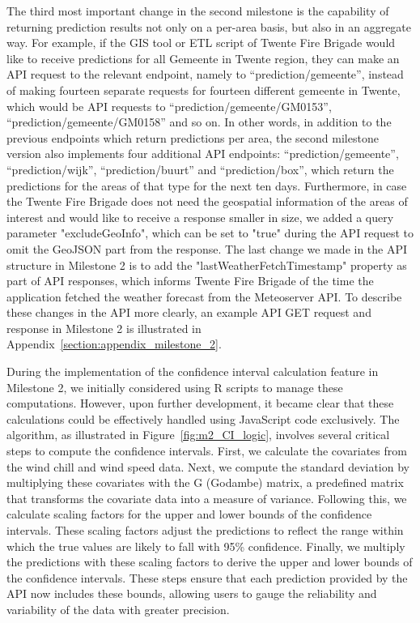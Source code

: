\documentclass{utitcphd_overleaf}
\begin{document}
The third most important change in the second milestone is the capability of returning prediction results not only on a per-area basis, but also in an aggregate way. For example, if the GIS tool or ETL script of Twente Fire Brigade would like to receive predictions for all Gemeente in Twente region, they can make an API request to the relevant endpoint, namely to “prediction/gemeente”, instead of making fourteen separate requests for fourteen different gemeente in Twente, which would be API requests to “prediction/gemeente/GM0153”, “prediction/gemeente/GM0158” and so on. In other words, in addition to the previous endpoints which return predictions per area, the second milestone version also implements four additional API endpoints: “prediction/gemeente”, “prediction/wijk”, “prediction/buurt” and “prediction/box”, which return the predictions for the areas of that type for the next ten days. Furthermore, in case the Twente Fire Brigade does not need the geospatial information of the areas of interest and would like to receive a response smaller in size, we added a query parameter "excludeGeoInfo", which can be set to "true" during the API request to omit the GeoJSON part from the response. The last change we made in the API structure in Milestone 2 is to add the "lastWeatherFetchTimestamp" property as part of API responses, which informs Twente Fire Brigade of the time the application fetched the weather forecast from the Meteoserver API. To describe these changes in the API more clearly, an example API GET request and response in Milestone 2 is illustrated in Appendix~\ref{section:appendix_milestone_2}.

During the implementation of the confidence interval calculation feature in Milestone 2, we initially considered using R scripts to manage these computations. However, upon further development, it became clear that these calculations could be effectively handled using JavaScript code exclusively. The algorithm, as illustrated in Figure~\ref{fig:m2_CI_logic}, involves several critical steps to compute the confidence intervals. First, we calculate the covariates from the wind chill and wind speed data. Next, we compute the standard deviation by multiplying these covariates with the G (Godambe) matrix, a predefined matrix that transforms the covariate data into a measure of variance. Following this, we calculate scaling factors for the upper and lower bounds of the confidence intervals. These scaling factors adjust the predictions to reflect the range within which the true values are likely to fall with 95\% confidence. Finally, we multiply the predictions with these scaling factors to derive the upper and lower bounds of the confidence intervals. These steps ensure that each prediction provided by the API now includes these bounds, allowing users to gauge the reliability and variability of the data with greater precision.
\end{document}
